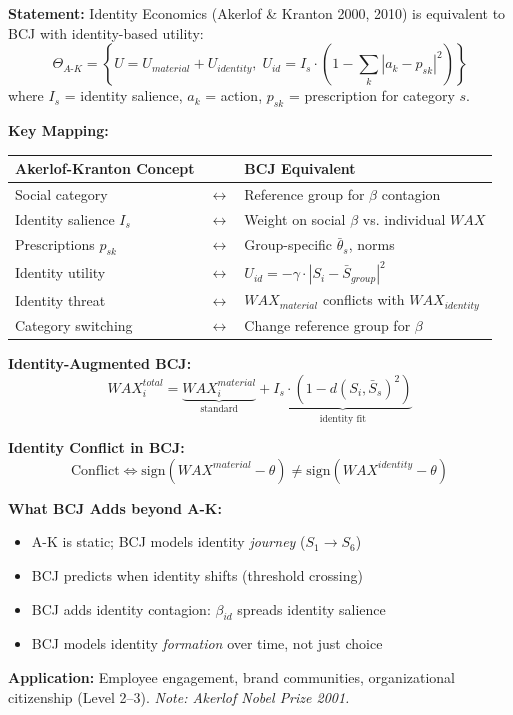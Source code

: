 \begin{tcolorbox}[colback=green!5!white, colframe=green!75!black,
    title=Theorem BCJ-T40: Akerlof-Kranton Identity Economics as Special Case]
\textbf{Statement:} Identity Economics (Akerlof \& Kranton 2000, 2010) is equivalent to BCJ with identity-based utility:
\begin{equation}
\Theta_{A\text{-}K} = \left\{U = U_{material} + U_{identity}, \; U_{id} = I_s \cdot \left(1 - \sum_k |a_k - p_{sk}|^2\right)\right\}
\end{equation}
where $I_s$ = identity salience, $a_k$ = action, $p_{sk}$ = prescription for category $s$.

\textbf{Key Mapping:}
\begin{center}
\begin{tabular}{lcl}
\toprule
\textbf{Akerlof-Kranton Concept} & & \textbf{BCJ Equivalent} \\
\midrule
Social category & $\leftrightarrow$ & Reference group for $\beta$ contagion \\
Identity salience $I_s$ & $\leftrightarrow$ & Weight on social $\beta$ vs. individual $WAX$ \\
Prescriptions $p_{sk}$ & $\leftrightarrow$ & Group-specific $\bar{\theta}_s$, norms \\
Identity utility & $\leftrightarrow$ & $U_{id} = -\gamma \cdot |S_i - \bar{S}_{group}|^2$ \\
Identity threat & $\leftrightarrow$ & $WAX_{material}$ conflicts with $WAX_{identity}$ \\
Category switching & $\leftrightarrow$ & Change reference group for $\beta$ \\
\bottomrule
\end{tabular}
\end{center}

\textbf{Identity-Augmented BCJ:}
\begin{equation}
WAX_i^{total} = \underbrace{WAX_i^{material}}_{\text{standard}} + \underbrace{I_s \cdot (1 - d(S_i, \bar{S}_s)^2)}_{\text{identity fit}}
\end{equation}

\textbf{Identity Conflict in BCJ:}
\begin{equation}
\text{Conflict} \Leftrightarrow \text{sign}(WAX^{material} - \theta) \neq \text{sign}(WAX^{identity} - \theta)
\end{equation}

\textbf{What BCJ Adds beyond A-K:}
\begin{itemize}[nosep]
\item A-K is static; BCJ models identity \textit{journey} ($S_1 \to S_6$)
\item BCJ predicts when identity shifts (threshold crossing)
\item BCJ adds identity contagion: $\beta_{id}$ spreads identity salience
\item BCJ models identity \textit{formation} over time, not just choice
\end{itemize}

\textbf{Application:} Employee engagement, brand communities, organizational citizenship (Level 2--3). \textit{Note: Akerlof Nobel Prize 2001.}
\end{tcolorbox}


